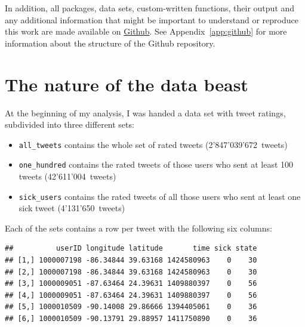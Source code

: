 \documentclass[11pt, a4paper,twoside]{report}\usepackage[]{graphicx}\usepackage[]{color}
\makeatletter
\newenvironment{kframe}{%
 \def\at@end@of@kframe{}%
 \ifinner\ifhmode%
  \def\at@end@of@kframe{\end{minipage}}%
  \begin{minipage}{\columnwidth}%
 \fi\fi%
 \def\FrameCommand##1{\hskip\@totalleftmargin \hskip-\fboxsep
 \colorbox{shadecolor}{##1}\hskip-\fboxsep
     \hskip-\linewidth \hskip-\@totalleftmargin \hskip\columnwidth}%
 \MakeFramed {\advance\hsize-\width
   \@totalleftmargin\z@ \linewidth\hsize
   \@setminipage}}%
 {\par\unskip\endMakeFramed%
 \at@end@of@kframe}
\newenvironment{knitrout}{}{} %
\makeatother
\begin{document}
In addition, all packages, data sets, custom-written functions, their output and any additional information that might be important to understand or reproduce this work are made available on \href{https://github.com/salathegroup/2016_TwitterEpi}{Github}. See Appendix~\ref{app:github} for more information about the structure of the Github repository.

\section{The nature of the data beast}
\label{sec:starting}

At the beginning of my analysis, I was handed a data set with tweet ratings, subdivided into three different sets: 

\begin{itemize}
  \item \texttt{all\_tweets} contains the whole set of rated tweets (2'847'039'672~tweets)
  \item \texttt{one\_hundred} contains the rated tweets of those users who sent at least 100 tweets (42'611'004~tweets)
  \item \texttt{sick\_users} contains the rated tweets of all those users who sent at least one sick tweet (4'131'650~tweets)
\end{itemize}

\clearpage
Each of the sets contains a row per tweet with the following six columns: 

\begin{knitrout}
\color{fgcolor}\begin{kframe}
\begin{verbatim}
##          userID longitude latitude       time sick state
## [1,] 1000007198 -86.34844 39.63168 1424580963    0    30
## [2,] 1000007198 -86.34844 39.63168 1424580963    0    30
## [3,] 1000009051 -87.63464 24.39631 1409880397    0    56
## [4,] 1000009051 -87.63464 24.39631 1409880397    0    56
## [5,] 1000010509 -90.14008 29.86666 1394405061    0    36
## [6,] 1000010509 -90.13791 29.88957 1411750890    0    36
\end{verbatim}
\end{kframe}
\end{knitrout}
\end{document}
